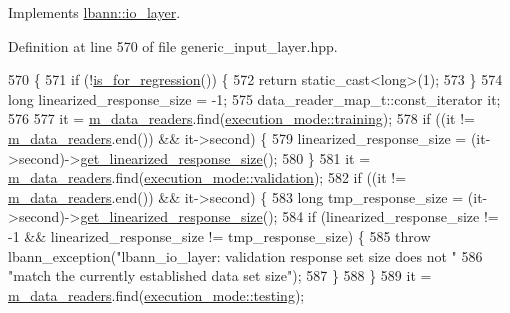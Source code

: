 Implements \hyperlink{classlbann_1_1io__layer_acbc2723e37e911eef6a38caa02c9e708}{lbann\+::io\+\_\+layer}.



Definition at line 570 of file generic\+\_\+input\+\_\+layer.\+hpp.


\begin{DoxyCode}
570                                                      \{
571     \textcolor{keywordflow}{if} (!\hyperlink{classlbann_1_1io__layer_a61f2e00334c820235795154492876476}{is\_for\_regression}()) \{
572       \textcolor{keywordflow}{return} \textcolor{keyword}{static\_cast<}\textcolor{keywordtype}{long}\textcolor{keyword}{>}(1);
573     \}
574     \textcolor{keywordtype}{long} linearized\_response\_size = -1;
575     data\_reader\_map\_t::const\_iterator it;
576 
577     it = \hyperlink{classlbann_1_1generic__input__layer_a6bc18860c02beed0252ea3cc87bc48d2}{m\_data\_readers}.find(\hyperlink{base_8hpp_a2781a159088df64ed7d47cc91c4dc0a8ac185ddac8b5a8f5aa23c5b80bc12d214}{execution\_mode::training});
578     \textcolor{keywordflow}{if} ((it != \hyperlink{classlbann_1_1generic__input__layer_a6bc18860c02beed0252ea3cc87bc48d2}{m\_data\_readers}.end()) && it->second) \{
579       linearized\_response\_size = (it->second)->\hyperlink{classlbann_1_1generic__input__layer_a6e5e587aa5b32bdfd2dd579a2746885d}{get\_linearized\_response\_size}();
580     \}
581     it = \hyperlink{classlbann_1_1generic__input__layer_a6bc18860c02beed0252ea3cc87bc48d2}{m\_data\_readers}.find(\hyperlink{base_8hpp_a2781a159088df64ed7d47cc91c4dc0a8aa617908b172c473cb8e8cda059e55bf0}{execution\_mode::validation});
582     \textcolor{keywordflow}{if} ((it != \hyperlink{classlbann_1_1generic__input__layer_a6bc18860c02beed0252ea3cc87bc48d2}{m\_data\_readers}.end()) && it->second) \{
583       \textcolor{keywordtype}{long} tmp\_response\_size = (it->second)->\hyperlink{classlbann_1_1generic__input__layer_a6e5e587aa5b32bdfd2dd579a2746885d}{get\_linearized\_response\_size}();
584       \textcolor{keywordflow}{if} (linearized\_response\_size != -1 && linearized\_response\_size != tmp\_response\_size) \{
585         \textcolor{keywordflow}{throw} lbann\_exception(\textcolor{stringliteral}{"lbann\_io\_layer: validation response set size does not "}
586                               \textcolor{stringliteral}{"match the currently established data set size"});
587       \}
588     \}
589     it = \hyperlink{classlbann_1_1generic__input__layer_a6bc18860c02beed0252ea3cc87bc48d2}{m\_data\_readers}.find(\hyperlink{base_8hpp_a2781a159088df64ed7d47cc91c4dc0a8aae2b1fca515949e5d54fb22b8ed95575}{execution\_mode::testing});

\end{DoxyCode}
